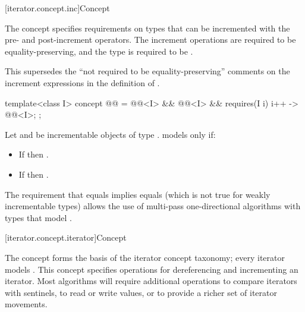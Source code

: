 [iterator.concept.inc]{Concept }

\pnum
The  concept specifies requirements on types that can be incremented with the pre-
and post-increment operators. The increment operations are required to be equality-preserving,
and the type is required to be .
\begin{note}
This supersedes the ``not required to be equality-preserving'' comments
on the increment expressions
in the definition of .
\end{note}

\begin{codeblock}
template<class I>
  concept @@ =
    @@<I> &&
    @@<I> &&
    requires(I i) {
      { i++ } -> @@<I>;
    };
\end{codeblock}

\pnum
Let  and  be incrementable objects of type .
 models  only if:
\begin{itemize}
\item If  then .
\item If  then .
\end{itemize}

\pnum
\begin{note}
The requirement that
 equals 
implies
 equals 
(which is not true for weakly incrementable types)
allows the use of multi-pass one-directional
algorithms with types that model .
\end{note}

[iterator.concept.iterator]{Concept }

\pnum
The  concept forms the basis
of the iterator concept taxonomy; every iterator models .
This concept specifies operations for dereferencing and incrementing
an iterator. Most algorithms will require additional operations
to compare iterators with sentinels, to
read or write values, or
to provide a richer set of iterator movements.

